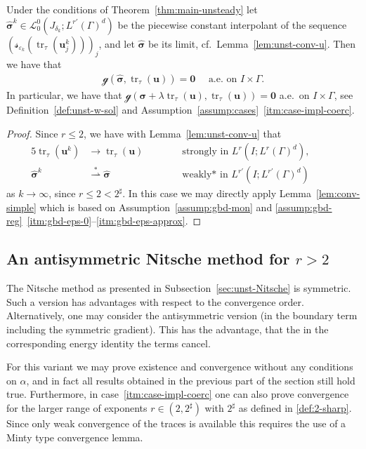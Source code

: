 \documentclass[reqno,a4paper]{amsart}
\def\vec#1{\boldsymbol{#1}}
\def\tr{\mathop{\mathrm{tr}}\nolimits}
\def\wsconv{\overset{*}{\rightharpoonup}}
\def\b0{\vec{0}}
\def\bu{\vec{u}}
\def\bsigma{\vec{\sigma}}
\def\gbd{\vec{\mathcal{g}}}
\begin{document}
	\begin{lemma}
		\label{lem:unst-conv-s-c2}
		Under the conditions of Theorem~\ref{thm:main-unsteady} let $\widehat{\bsigma}^k  \in \mathcal{L}^0_0(J_{\delta_k}; L^{r'}(\Gamma)^d) $ 
		be the piecewise constant interpolant of the sequence $(\mathbf{\mathcal{s}}_{\varepsilon_k}(\tr_\tau(\bu^k_j)))_j$, and let $\widehat{\bsigma}$ be its limit, cf.~Lemma~\ref{lem:unst-conv-u}. 
		Then we have that 
		\begin{align*}
			\gbd(\widehat{\bsigma},\tr_{\tau}(\bu)) = \b0 \quad \text{ a.e. on } I \times \Gamma. 
		\end{align*}
		In particular, we have that $\gbd(\bsigma + \lambda \tr_{\tau}(\bu),\tr_{\tau}(\bu)) = \b0$ a.e.~on $I \times \Gamma$, see Definition~\ref{def:unst-w-sol} and Assumption~\ref{assump:cases}~\ref{itm:case-impl-coerc}. 
	\end{lemma}
	\begin{proof}
		Since $r \leq 2$, we have  with Lemma~\ref{lem:unst-conv-u} that 
		\begin{alignat}{5}
			\tr_\tau (\bu^k) &\to \tr_\tau(\bu) \qquad &&\text{ strongly in } L^r(I;L^r(\Gamma)^d),
			\quad
			&& \\
			\widehat{\bsigma}^k &\wsconv \widehat{\bsigma} \qquad &&\text{ weakly* in } L^{r'}(I;L^{r'}(\Gamma)^d)&& 
		\end{alignat}	
		as $k \to \infty$, since $r \leq 2 < 2^\sharp$. 
		In this case we may directly apply Lemma~\ref{lem:conv-simple} which is based on Assumption~\ref{assump:gbd-mon} and \ref{assump:gbd-reg}~\ref{itm:gbd-eps-0}--\ref{itm:gbd-eps-approx}. 
	\end{proof}
	
	\subsection{An antisymmetric Nitsche method for $r>2$}\label{sec:asym-Nitsche}
	
	The Nitsche method as presented in Subsection~\ref{sec:unst-Nitsche} is symmetric. Such a version has advantages with respect to the convergence order. 
	Alternatively, one may consider the antisymmetric version (in the boundary term including the symmetric gradient). 
	This has the advantage, that the in the corresponding energy identity the terms cancel. 
	
	For this variant we may prove existence and convergence without any conditions on  $\alpha$, and in fact all results obtained in the previous part of the section still hold true. 
	Furthermore, in case~\ref{itm:case-impl-coerc} one can also prove convergence for the larger range of exponents $r \in (2,2^\sharp)$ with $2^\sharp$ as defined in \eqref{def:2-sharp}. 
	Since only weak convergence of the traces is available this requires the use of a Minty type convergence lemma. 
	
\end{document}
